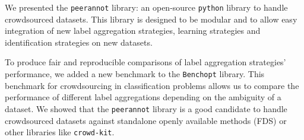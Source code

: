 We presented the \texttt{peerannot} library: an open-source \texttt{python} library to handle crowdsourced datasets.
This library is designed to be modular and to allow easy integration of new label aggregation strategies, learning strategies and identification strategies on new datasets.

To produce fair and reproducible comparisons of label aggregation strategies' performance, we added a new benchmark to the \texttt{Benchopt} library.
This benchmark for crowdsourcing in classification problems allows us to compare the performance of different label aggregations depending on the ambiguity of a dataset.
We showed that the \texttt{peerannot} library is a good candidate to handle crowdsourced datasets against standalone openly available methods (FDS) or other libraries like \texttt{crowd-kit}.

